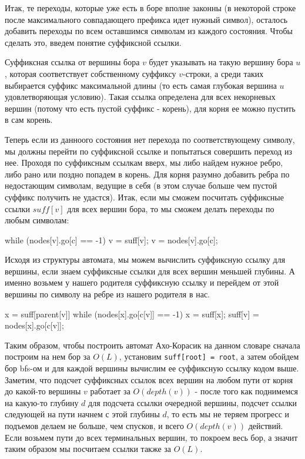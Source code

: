 Итак, те переходы, которые уже есть в боре вполне законны (в некоторой строке после максимального совпадающего префикса идет нужный символ), осталось добавить переходы по всем оставшимся символам из каждого состояния. Чтобы сделать это, введем понятие суффиксной ссылки. 

Суффиксная ссылка от вершины бора $v$ будет указывать на такую вершину бора $u$, которая соответствует собственному суффиксу $v$-строки, а среди таких выбирается суффикс максимальной длины (то есть самая глубокая вершина $u$ удовлетворяющая условию). Такая ссылка определена для всех некорневых вершин (потому что есть пустой суффикс - корень), для корня ее можно пустить в сам корень.

Теперь если из данноого состояния нет перехода по соответствующему символу, мы должны перейти по суффиксной ссылке и попытаться совершить переход из нее. Проходя по суффиксным ссылкам вверх, мы либо найдем нужное ребро, либо рано или поздно попадем в корень. Для корня разумно добавить ребра по недостающим символам, ведущие в себя (в этом случае больше чем пустой суффикс получить не удастся). Итак, если мы сможем посчитать суффиксные ссылки $suff[v]$ для всех вершин бора, то мы сможем делать переходы по любым символам:

\begin{cppcode}
while (nodes[v].go[c] == -1)
	v = suff[v];
v = nodes[v].go[c];
\end{cppcode}

Исходя из структуры автомата, мы можем вычислить суффиксную ссылку для вершины, если знаем суффиксные ссылки для всех вершин меньшей глубины. А именно возьмем у нашего родителя суффиксную ссылку и перейдем от этой вершины по символу на ребре из нашего родителя в нас.

\begin{cppcode}
x = suff[parent[v]]
while (nodes[x].go[c[v]] == -1)
	x = suff[x];
suff[v] = nodes[x].go[c[v]];
\end{cppcode}
 
Таким образом, чтобы построить автомат Ахо-Корасик на данном словаре сначала построим на нем бор за $O(L)$, установим \texttt{suff[root] = root}, а затем обойдем бор bfs-ом и для каждой вершины вычислим ее суффиксную ссылку кодом выше. Заметим, что подсчет суффиксных ссылок всех вершин на любом пути от корня до какой-то вершины $v$ работает за $O(depth(v))$ - после того как поднимемся на какую-то глубину $d$ для подсчета ссылки очередной вершины, подсчет ссылки следующей на пути начнем с этой глубины $d$, то есть мы не теряем прогресс и подъемов делаем не больше, чем спусков, и всего $O(depth(v))$ действий. Если возьмем пути до всех терминальных вершин, то покроем весь бор, а значит таким образом мы посчитаем ссылки также за $O(L)$. 

